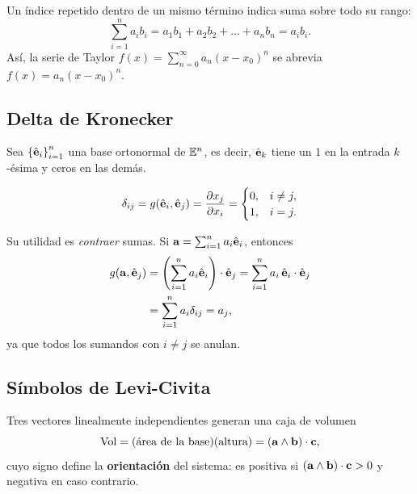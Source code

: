 Un \'indice repetido dentro de un mismo t\'ermino indica suma sobre todo su
rango:
\begin{equation}
  \label{eq:einstein}
  \sum_{i=1}^{n}a_ib_i=a_1b_1+a_2b_2+\dots+a_nb_n=a_ib_i .
\end{equation}
As\'i, la serie de Taylor $f(x)=\sum_{n=0}^{\infty}a_n(x-x_0)^n$ se abrevia
$f(x)=a_n(x-x_0)^n$.

\subsection{Delta de Kronecker}
\label{subsec:kronecker}

Sea $\left\{ \hat{\mathbf{e}}_i \right\}_{i=1}^{n}$ una base ortonormal de $\mathbb{E}^n$, es decir,
$\hat{\mathbf{e}}_k$ tiene un $1$ en la entrada $k$-\'esima y ceros en las dem\'as.

\begin{definicion}
  \label{def:kronecker}
  \begin{equation}
    \label{eq:kronecker}
    \delta_{ij}=g(\hat{\mathbf{e}}_i,\hat{\mathbf{e}}_j)=\frac{\partial x_j}{\partial x_i}=
    \begin{cases}
      0, & i\neq j,\\
      1, & i=j .
    \end{cases}
  \end{equation}
\end{definicion}

Su utilidad es \emph{contraer} sumas. Si $\mathbf{a}=\sum_{i=1}^{n}a_i\hat{\mathbf{e}}_i$,
entonces
\begin{equation}
  \label{eq:contraccion_kronecker}
  \begin{aligned}
    g(\mathbf{a},\hat{\mathbf{e}}_j)
      &=\left( \sum_{i=1}^{n}a_i\hat{\mathbf{e}}_i \right)\cdot\hat{\mathbf{e}}_j
       =\sum_{i=1}^{n}a_i\,\hat{\mathbf{e}}_i\cdot\hat{\mathbf{e}}_j\\
      &=\sum_{i=1}^{n}a_i\delta_{ij}=a_j ,
  \end{aligned}
\end{equation}
ya que todos los sumandos con $i\neq j$ se anulan.

\subsection{S\'imbolos de Levi-Civita}
\label{subsec:levi_civita}

Tres vectores linealmente independientes generan una caja de volumen
\begin{equation}
  \label{eq:volumen_caja}
  \mathrm{Vol}=(\text{\'area de la base})(\text{altura})
    =(\mathbf{a}\wedge\mathbf{b})\cdot\mathbf{c},
\end{equation}
cuyo signo define la \textbf{orientaci\'on} del sistema: es positiva si
$(\mathbf{a}\wedge\mathbf{b})\cdot\mathbf{c}>0$ y negativa en caso contrario.

